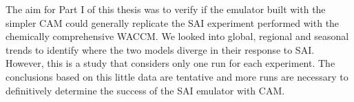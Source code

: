 The aim for Part I of this thesis was to verify if the emulator built with the simpler CAM could generally replicate the SAI experiment performed with the chemically comprehensive WACCM. We looked into global, regional and seasonal trends to identify where the two models diverge in their response to SAI. However, this is a study that considers only one run for each experiment. The conclusions based on this little data are tentative and more runs are necessary to definitively determine the success of the SAI emulator with CAM. 
